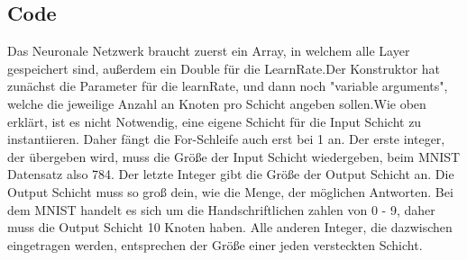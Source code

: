 \documentclass[12pt]{article}
\begin{document}
\subsection{ Code}
Das Neuronale Netzwerk braucht zuerst ein Array, in welchem alle Layer gespeichert sind, außerdem ein Double für die LearnRate.Der Konstruktor hat zunächst die Parameter für die learnRate, und dann noch "variable arguments", welche die jeweilige Anzahl an Knoten pro Schicht angeben sollen.Wie oben erklärt, ist es nicht Notwendig, eine eigene Schicht für die Input Schicht zu instantiieren. Daher fängt die For-Schleife auch erst bei 1 an. Der erste integer, der übergeben wird, muss die Größe der Input Schicht wiedergeben, beim MNIST Datensatz also 784. Der letzte Integer gibt die Größe der Output Schicht an. Die Output Schicht muss so groß dein, wie die Menge, der möglichen Antworten. Bei dem MNIST handelt es sich um die Handschriftlichen zahlen von 0 - 9, daher muss die Output Schicht 10 Knoten haben. Alle anderen Integer, die dazwischen eingetragen werden, entsprechen der Größe einer jeden versteckten Schicht.
\end{document}

